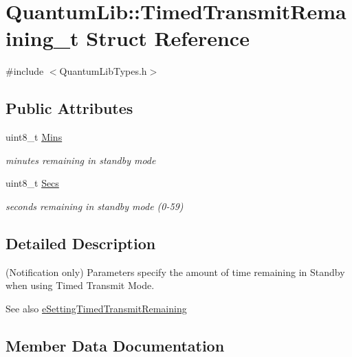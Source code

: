 \hypertarget{struct_quantum_lib_1_1_timed_transmit_remaining__t}{}\section{Quantum\+Lib\+:\+:Timed\+Transmit\+Remaining\+\_\+t Struct Reference}
\label{struct_quantum_lib_1_1_timed_transmit_remaining__t}


{\ttfamily \#include $<$Quantum\+Lib\+Types.\+h$>$}

\subsection*{Public Attributes}
\begin{DoxyCompactItemize}
\item 
uint8\+\_\+t \mbox{\hyperlink{struct_quantum_lib_1_1_timed_transmit_remaining__t_a8b7c3d6532d70691e414a53281f8a461}{Mins}}
\begin{DoxyCompactList}\small\item\em minutes remaining in standby mode \end{DoxyCompactList}\item 
uint8\+\_\+t \mbox{\hyperlink{struct_quantum_lib_1_1_timed_transmit_remaining__t_ac84e3bd9617a6575140a535442a25b7c}{Secs}}
\begin{DoxyCompactList}\small\item\em seconds remaining in standby mode (0-\/59) \end{DoxyCompactList}\end{DoxyCompactItemize}


\subsection{Detailed Description}
(Notification only) Parameters specify the amount of time remaining in Standby when using Timed Transmit Mode. \begin{DoxySeeAlso}{See also}
\mbox{\hyperlink{namespace_quantum_lib_acc8124e3e65bca4aa798d03a55e3d54cab4e5cf461eae89a7a1b49e675f4616d3}{e\+Setting\+Timed\+Transmit\+Remaining}} 
\end{DoxySeeAlso}


\subsection{Member Data Documentation}
\mbox{\label{struct_quantum_lib_1_1_timed_transmit_remaining__t_a8b7c3d6532d70691e414a53281f8a461}} 
